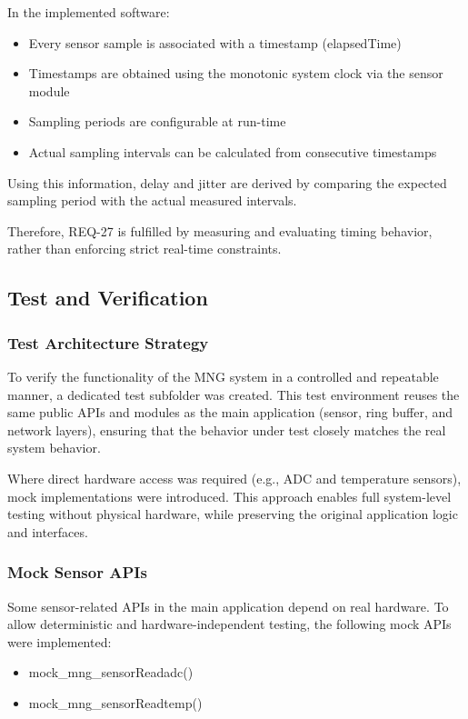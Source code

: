 In the implemented software:
\begin{itemize}
    \item Every sensor sample is associated with a timestamp (elapsedTime)
    \item Timestamps are obtained using the monotonic system clock via the sensor module
    \item Sampling periods are configurable at run-time
    \item Actual sampling intervals can be calculated from consecutive timestamps
\end{itemize}









Using this information, delay and jitter are derived by comparing the expected sampling period with the actual measured intervals.

Therefore, REQ-27 is fulfilled by measuring and evaluating timing behavior, rather than enforcing strict real-time constraints.

\newpage
\subsection{Test and Verification}

\subsubsection{Test Architecture Strategy}
To verify the functionality of the MNG system in a controlled and repeatable 
manner, a dedicated test subfolder was created. This test environment reuses the 
same public APIs and modules as the main application (sensor, ring buffer, and 
network layers), ensuring that the behavior under test closely matches the real 
system behavior.

Where direct hardware access was required (e.g., ADC and temperature sensors), 
mock implementations were introduced. This approach enables full system-level 
testing without physical hardware, while preserving the original application logic 
and interfaces.


\subsubsection{Mock Sensor APIs}

Some sensor-related APIs in the main application depend on real hardware. To allow 
deterministic and hardware-independent testing, the following mock APIs were 
implemented:
\begin{itemize}
    \item mock\_mng\_sensorReadadc()
    \item mock\_mng\_sensorReadtemp()
\end{itemize}

